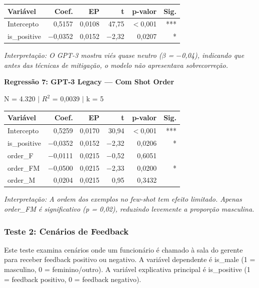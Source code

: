 \documentclass[12pt,a4paper]{article}
\begin{document}
\begin{table}[H]
\centering
\begin{tabular}{lrrrrr}
\toprule
\textbf{Variável} & \textbf{Coef.} & \textbf{EP} & \textbf{t} & \textbf{p-valor} & \textbf{Sig.} \\
\midrule
Intercepto & 0,5157 & 0,0108 & 47,75 & $<$0,001 & *** \\
is\_positive & $-$0,0352 & 0,0152 & $-$2,32 & 0,0207 & * \\
\bottomrule
\end{tabular}
\end{table}

\noindent\textit{Interpretação: O GPT-3 mostra viés quase neutro ($\beta$ = $-$0,04), indicando
que antes das técnicas de mitigação, o modelo não apresentava
sobrecorreção.}

\vspace{0.5cm}
\noindent\textbf{Regressão 7: GPT-3 Legacy --- Com Shot Order}

\noindent N = 4.320 $|$ $R^2$ = 0,0039 $|$ k = 5

\begin{table}[H]
\centering
\begin{tabular}{lrrrrr}
\toprule
\textbf{Variável} & \textbf{Coef.} & \textbf{EP} & \textbf{t} & \textbf{p-valor} & \textbf{Sig.} \\
\midrule
Intercepto & 0,5259 & 0,0170 & 30,94 & $<$0,001 & *** \\
is\_positive & $-$0,0352 & 0,0152 & $-$2,32 & 0,0206 & * \\
order\_F & $-$0,0111 & 0,0215 & $-$0,52 & 0,6051 & \\
order\_FM & $-$0,0500 & 0,0215 & $-$2,33 & 0,0200 & * \\
order\_M & 0,0204 & 0,0215 & 0,95 & 0,3432 & \\
\bottomrule
\end{tabular}
\end{table}

\noindent\textit{Interpretação: A ordem dos exemplos no few-shot tem efeito limitado.
Apenas order\_FM é significativo (p = 0,02), reduzindo levemente a
proporção masculina.}


\subsubsection{Teste 2: Cenários de Feedback}

Este teste examina cenários onde um funcionário é chamado à sala do
gerente para receber feedback positivo ou negativo. A variável
dependente é is\_male (1 = masculino, 0 = feminino/outro). A variável
explicativa principal é is\_positive (1 = feedback positivo, 0 = feedback
negativo).
\end{document}
